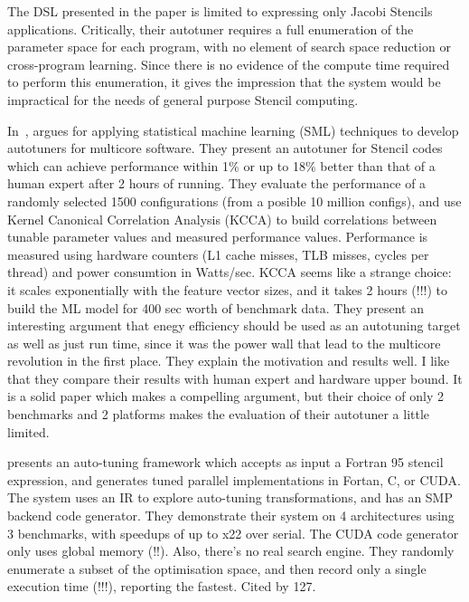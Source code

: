 The DSL presented in the paper is limited to expressing only Jacobi
Stencils applications. Critically, their autotuner requires a full
enumeration of the parameter space for each program, with no element
of search space reduction or cross-program learning. Since there is no
evidence of the compute time required to perform this enumeration, it
gives the impression that the system would be impractical for the
needs of general purpose Stencil
computing.

In~\cite{Ganapathi2009}, \citeauthor{Ganapathi2009} argues for
applying statistical machine learning (SML) techniques to develop
autotuners for multicore software. They present an autotuner for
Stencil codes which can achieve performance within 1\% or up to 18\%
better than that of a human expert after 2 hours of running. They
evaluate the performance of a randomly selected 1500 configurations
(from a posible 10 million configs), and use Kernel Canonical
Correlation Analysis (KCCA) to build correlations between tunable
parameter values and measured performance values. Performance is
measured using hardware counters (L1 cache misses, TLB misses, cycles
per thread) and power consumtion in Watts/sec. KCCA seems like a
strange choice: it scales exponentially with the feature vector sizes,
and it takes 2 hours (!!!) to build the ML model for 400 sec worth of
benchmark data. They present an interesting argument that enegy
efficiency should be used as an autotuning target as well as just run
time, since it was the power wall that lead to the multicore
revolution in the first place. They explain the motivation and results
well. I like that they compare their results with human expert and
hardware upper bound. It is a solid paper which makes a compelling
argument, but their choice of only 2 benchmarks and 2 platforms makes
the evaluation of their autotuner a little limited.

\citeauthor{Kamil2010} presents an auto-tuning framework which accepts as input a
Fortran 95 stencil expression, and generates tuned parallel
implementations in Fortan, C, or CUDA. The system uses an IR to
explore auto-tuning transformations, and has an SMP backend code
generator. They demonstrate their system on 4 architectures using 3
benchmarks, with speedups of up to x22 over serial. The CUDA code
generator only uses global memory (!!). Also, there's no real search
engine. They randomly enumerate a subset of the optimisation space,
and then record only a single execution time (!!!), reporting the
fastest. Cited by 127.~\cite{Kamil2010}


